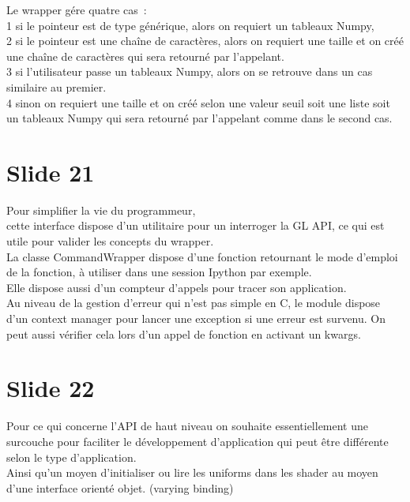 \documentclass[12pt]{article}
\begin{document}
\noindent%
Le wrapper gére quatre cas~: \\
 1 si le pointeur est de type générique, alors on requiert un tableaux Numpy, \\
 2 si le pointeur est une chaîne de caractères, alors on requiert une taille et on créé une
 chaîne de caractères qui sera retourné par l'appelant. \\
 3 si l'utilisateur passe un tableaux Numpy, alors on se retrouve dans un cas similaire au premier. \\
 4 sinon on requiert une taille et on créé selon une valeur seuil soit une liste soit un tableaux
 Numpy qui sera retourné par l'appelant comme dans le second cas.

\section{Slide 21}

\noindent%
Pour simplifier la vie du programmeur, \\
cette interface dispose d'un utilitaire pour un interroger la GL API, ce qui est utile pour valider
les concepts du wrapper. \\

\noindent%
La classe CommandWrapper dispose d'une fonction retournant le mode d'emploi de la fonction, à
utiliser dans une session Ipython par exemple. \\

\noindent%
Elle dispose aussi d'un compteur d'appels pour tracer son application. \\

\noindent%
Au niveau de la gestion d'erreur qui n'est pas simple en C, le module dispose d'un context manager
pour lancer une exception si une erreur est survenu. On peut aussi vérifier cela lors d'un appel de
fonction en activant un kwargs.

\section{Slide 22}

\noindent%
Pour ce qui concerne l'API de haut niveau on souhaite essentiellement une surcouche pour faciliter
le développement d'application qui peut être différente selon le type d'application. \\

\noindent%
Ainsi qu'un moyen d'initialiser ou lire les uniforms dans les shader au moyen d'une interface
orienté objet. (varying binding)
\end{document}
